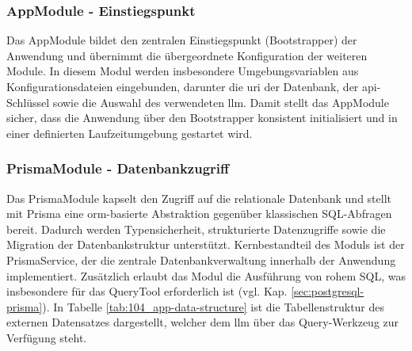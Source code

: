 \subsubsection{AppModule - Einstiegspunkt}
\label{sec:app-appmodule}

Das AppModule bildet den zentralen Einstiegspunkt (Bootstrapper) der Anwendung und übernimmt die übergeordnete Konfiguration der weiteren Module.
In diesem Modul werden insbesondere Umgebungsvariablen aus Konfigurationsdateien eingebunden, darunter die \gls{uri} der Datenbank, der \gls{api}-Schlüssel sowie die Auswahl des verwendeten \gls{llm}.
Damit stellt das AppModule sicher, dass die Anwendung über den Bootstrapper konsistent initialisiert und in einer definierten Laufzeitumgebung gestartet wird.

\subsubsection{PrismaModule - Datenbankzugriff}
\label{sec:app-prismamodule}

Das PrismaModule kapselt den Zugriff auf die relationale Datenbank und stellt mit Prisma eine \gls{orm}-basierte Abstraktion gegenüber klassischen SQL-Abfragen bereit.
Dadurch werden Typensicherheit, strukturierte Datenzugriffe sowie die Migration der Datenbankstruktur unterstützt.
Kernbestandteil des Moduls ist der PrismaService, der die zentrale Datenbankverwaltung innerhalb der Anwendung implementiert.
Zusätzlich erlaubt das Modul die Ausführung von rohem SQL, was insbesondere für das QueryTool erforderlich ist (vgl. Kap. \ref{sec:postgresql-prisma}).
In Tabelle \ref{tab:104_app-data-structure} ist die Tabellenstruktur des externen Datensatzes dargestellt, welcher dem \gls{llm} über das Query-Werkzeug zur Verfügung steht.

